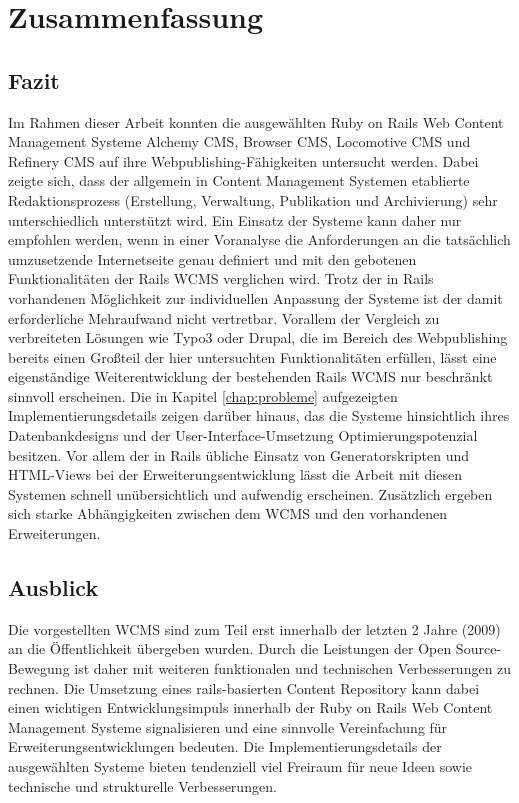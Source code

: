 \chapter{Zusammenfassung}

\section{Fazit}

Im Rahmen dieser Arbeit konnten die ausgewählten Ruby on Rails Web Content Management Systeme Alchemy CMS, Browser CMS, Locomotive CMS und Refinery CMS auf ihre Webpublishing-Fähigkeiten untersucht werden. Dabei zeigte sich, dass der allgemein in Content Management Systemen etablierte Redaktionsprozess (Erstellung, Verwaltung, Publikation und Archivierung) sehr unterschiedlich unterstützt wird.
Ein Einsatz der Systeme kann daher nur empfohlen werden, wenn in einer Voranalyse die Anforderungen an die tatsächlich umzusetzende Internetseite genau definiert und mit den gebotenen Funktionalitäten der Rails WCMS verglichen wird. Trotz der in Rails vorhandenen Möglichkeit zur individuellen Anpassung der Systeme ist der damit erforderliche Mehraufwand nicht vertretbar. Vorallem der Vergleich zu verbreiteten Lösungen wie Typo3 oder Drupal, die im Bereich des Webpublishing bereits einen Großteil der hier untersuchten Funktionalitäten erfüllen, lässt eine eigenständige Weiterentwicklung der bestehenden Rails WCMS nur beschränkt sinnvoll erscheinen.
Die in Kapitel \ref{chap:probleme} aufgezeigten Implementierungsdetails zeigen darüber hinaus, das die Systeme hinsichtlich ihres Datenbankdesigns und der User-Interface-Umsetzung Optimierungspotenzial besitzen. Vor allem der in Rails übliche Einsatz von Generatorskripten und HTML-Views bei der Erweiterungsentwicklung lässt die Arbeit mit diesen Systemen schnell unübersichtlich und aufwendig erscheinen. Zusätzlich ergeben sich starke Abhängigkeiten zwischen dem WCMS und den vorhandenen Erweiterungen.

\section{Ausblick}
Die vorgestellten WCMS sind zum Teil erst innerhalb der letzten 2 Jahre (2009) an die Öffentlichkeit übergeben wurden. Durch die Leistungen der Open Source-Bewegung ist daher mit weiteren funktionalen und technischen Verbesserungen zu rechnen. Die Umsetzung eines rails-basierten Content Repository kann dabei einen wichtigen Entwicklungsimpuls innerhalb der Ruby on Rails Web Content Management Systeme signalisieren und eine sinnvolle Vereinfachung für Erweiterungsentwicklungen bedeuten.
Die Implementierungsdetails der ausgewählten Systeme bieten tendenziell viel Freiraum für neue Ideen sowie technische und strukturelle Verbesserungen.

